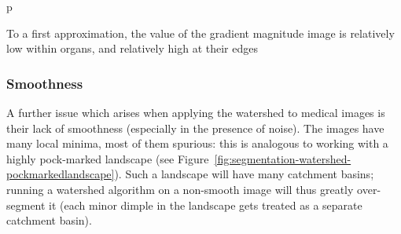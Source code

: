 \begin{stusubfig}{p}
	\hspace{4mm}%
\caption{To a first approximation, the value of the gradient magnitude image is relatively low within organs, and relatively high at their edges}
\label{fig:segmentation-watershed-gradientmagnitude}
\end{stusubfig}

\subsubsection{Smoothness}

A further issue which arises when applying the watershed to medical images is their lack of smoothness (especially in the presence of noise). The images have many local minima, most of them spurious: this is analogous to working with a highly pock-marked landscape (see Figure~\ref{fig:segmentation-watershed-pockmarkedlandscape}). Such a landscape will have many catchment basins; running a watershed algorithm on a non-smooth image will thus greatly over-segment it (each minor dimple in the landscape gets treated as a separate catchment basin).


